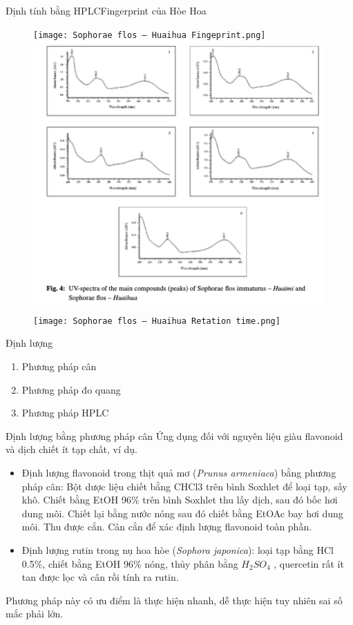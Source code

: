 \documentclass[11pt]{beamer}
\begin{document}
\begin{frame}{Định tính bằng HPLC}{Fingerprint của Hòe Hoa}
\begin{figure}
	\centering
	
	\texttt{[image: Sophorae flos – Huaihua Fingeprint.png]}
	\includegraphics[height=0.4\textheight]{Sophora japonica-UV.png}
	\texttt{[image: Sophorae flos – Huaihua Retation time.png]}
\end{figure}
	
\end{frame}
\begin{frame}{Định lượng}
	\begin{enumerate}
		\item Phương pháp cân 
		\item Phương pháp đo quang 
		\item Phương pháp HPLC
	\end{enumerate}
\end{frame}
\begin{frame}{Định lượng bằng phương pháp cân}
Ứng dụng đối với nguyên liệu giàu flavonoid và dịch chiết ít tạp chất, ví dụ.
\begin{itemize}
	\item Định lượng flavonoid trong thịt quả mơ ({\it Prunus armeniaca}) bằng phương pháp cân: Bột dược liệu chiết bằng CHCl3 trên bình Soxhlet để loại tạp, sấy khô. Chiết bằng EtOH 96\% trên bình Soxhlet thu lấy dịch, sau đó bốc hơi dung môi. Chiết lại bằng nước nóng sau đó chiết bằng EtOAc bay hơi dung môi. Thu được cắn. Cân cắn để xác định lượng flavonoid toàn phần. 
	\item Định lượng rutin trong nụ hoa hòe ({\it Sophora japonica}): loại tạp bằng HCl 0.5\%, chiết bằng EtOH 96\% nóng, thủy phân bằng $H_2SO_4$ , quercetin rất ít tan được lọc và cân rồi tính ra rutin.\\ 
\end{itemize}
Phương pháp này có ưu điểm là thực hiện nhanh, dễ thực hiện tuy nhiên sai số 
mắc phải lớn. \\
\end{frame}
\end{document}
